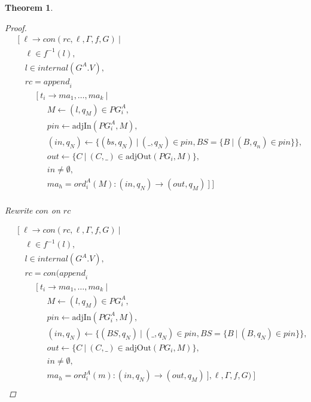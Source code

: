 \documentclass[twocolumn, openany]{sig-alternate-10pt}
\newtheorem{thm}{Theorem}
\begin{document}
\begin{thm}
\begin{proof}
  \[ \begin{array}{l}
     ~~~~~ [~ \ell \rightarrow con(rc,\ell,\Gamma,f,G) ~\vert~ \\
     ~~~~~~~~~ \ell \in f^{-1}(l), \\
     ~~~~~~~~~ l \in internal(G^A.V), \\
     ~~~~~~~~~ rc = \mathit{append}_i~  \\
     ~~~~~~~~~~~~~~~ [~ t_i \rightarrow ma_1, \dots, ma_k ~\vert~ \\
     ~~~~~~~~~~~~~~~~~~~~~ M \leftarrow (l,q_M) \in PG^A_i, \\
     ~~~~~~~~~~~~~~~~~~~~~ pin \leftarrow \text{adjIn}(PG^A_i,M), \\
     ~~~~~~~~~~~~~~~~~~~~~ (in,q_N) \leftarrow \{ (bs,q_N) ~\vert~ (\_,q_N) \in pin, BS=\{B ~\vert~ (B,q_n) \in pin \} \}, \\
     ~~~~~~~~~~~~~~~~~~~~~ out \leftarrow \{ C ~\vert~ (C,\_) \in \text{adjOut}(PG_i,M) \}, \\
     ~~~~~~~~~~~~~~~~~~~~~ in \neq \emptyset, \\
     ~~~~~~~~~~~~~~~~~~~~~ ma_h = ord^A_i(M) : (in,q_N) \rightarrow (out,q_M) ~] ~] \\
  \end{array} \]%

  Rewrite $con$ on $rc$

  \[ \begin{array}{l}
     ~~~~~ [~ \ell \rightarrow con(rc,\ell,\Gamma,f,G) ~\vert~ \\
     ~~~~~~~~~ \ell \in f^{-1}(l), \\
     ~~~~~~~~~ l \in internal(G^A.V), \\
     ~~~~~~~~~ rc = con(\mathit{append}_i~  \\
     ~~~~~~~~~~~~~~~ [~ t_i \rightarrow ma_1, \dots, ma_k ~\vert~ \\
     ~~~~~~~~~~~~~~~~~~~~~ M \leftarrow (l,q_M) \in PG^A_i, \\
     ~~~~~~~~~~~~~~~~~~~~~ pin \leftarrow \text{adjIn}(PG^A_i,M), \\
     ~~~~~~~~~~~~~~~~~~~~~ (in,q_N) \leftarrow \{ (BS,q_N) ~\vert~ (\_,q_N) \in pin, BS=\{B ~\vert~ (B,q_N) \in pin \} \}, \\
     ~~~~~~~~~~~~~~~~~~~~~ out \leftarrow \{ C ~\vert~ (C,\_) \in \text{adjOut}(PG_i,M) \}, \\
     ~~~~~~~~~~~~~~~~~~~~~ in \neq \emptyset, \\
     ~~~~~~~~~~~~~~~~~~~~~ ma_h = ord^A_i(m) : (in,q_N) \rightarrow (out,q_M) ~],\ell,\Gamma,f,G) ~] \\
  \end{array} \]%


\end{proof}
\end{thm}
\end{document}
